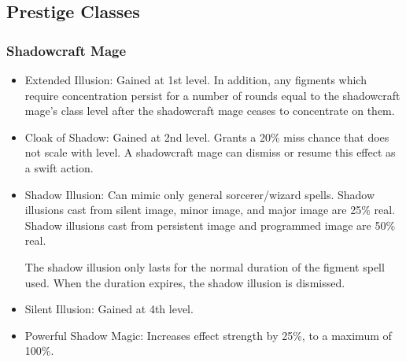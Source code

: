 \subsection{Prestige Classes}
\subsubsection{Shadowcraft Mage}
\begin{itemize}
\item Extended Illusion: Gained at 1st level. In addition, any figments which require concentration persist for a number of rounds equal to the shadowcraft mage's class level after the shadowcraft mage ceases to concentrate on them.
\item Cloak of Shadow: Gained at 2nd level. Grants a 20\% miss chance that does not scale with level. A shadowcraft mage can dismiss or resume this effect as a swift action.
\item Shadow Illusion: Can mimic only general sorcerer/wizard spells. Shadow illusions cast from silent image, minor image, and major image are 25\% real. Shadow illusions cast from persistent image and programmed image are 50\% real.
\par The shadow illusion only lasts for the normal duration of the figment spell used. When the duration expires, the shadow illusion is dismissed.
\item Silent Illusion: Gained at 4th level.
\item Powerful Shadow Magic: Increases effect strength by 25\%, to a maximum of 100\%.
\end{itemize}
